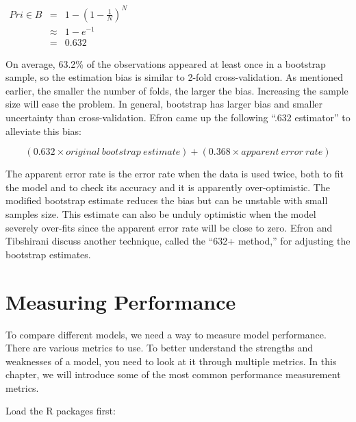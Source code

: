 \documentclass[12pt,]{krantz}
\begin{document}
\(\begin{array}{ccc} Pr{i\in B} & = & 1-\left(1-\frac{1}{N}\right)^{N}\\  & \approx & 1-e^{-1}\\  & = & 0.632 \end{array}\)

On average, 63.2\% of the observations appeared at least once in a bootstrap sample, so the estimation bias is similar to 2-fold cross-validation. As mentioned earlier, the smaller the number of folds, the larger the bias. Increasing the sample size will ease the problem. In general, bootstrap has larger bias and smaller uncertainty than cross-validation. Efron came up the following ``.632 estimator'' to alleviate this bias:

\[(0.632 × original\ bootstrap\ estimate) + (0.368 × apparent\ error\ rate)\]

The apparent error rate is the error rate when the data is used twice, both to fit the model and to check its accuracy and it is apparently over-optimistic. The modified bootstrap estimate reduces the bias but can be unstable with small samples size. This estimate can also be unduly optimistic when the model severely over-fits since the apparent error rate will be close to zero. Efron and Tibshirani \citep{b632plus} discuss another technique, called the ``632+ method,'' for adjusting the bootstrap estimates.

\hypertarget{measuring-performance}{%
\chapter{Measuring Performance}\label{measuring-performance}}

To compare different models, we need a way to measure model performance. There are various metrics to use. To better understand the strengths and weaknesses of a model, you need to look at it through multiple metrics. In this chapter, we will introduce some of the most common performance measurement metrics.

Load the R packages first:
\end{document}
